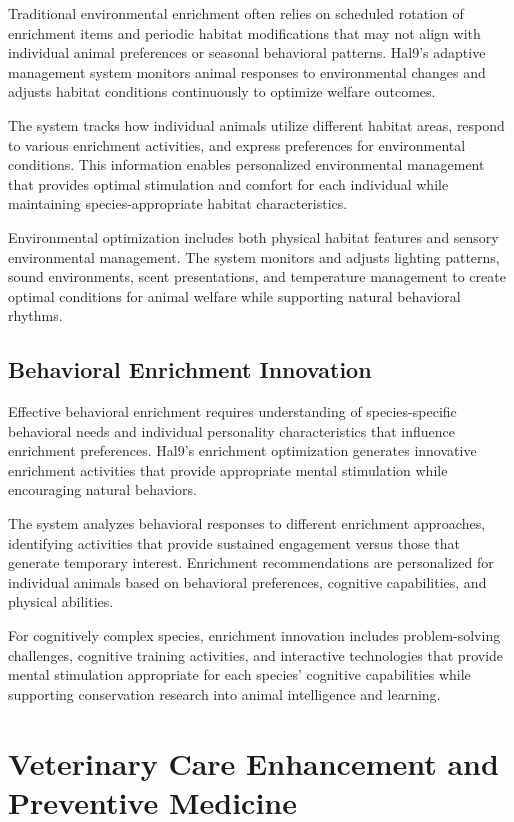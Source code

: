 \documentclass[
  Letterpaper,
]{scrbook}
\begin{document}
Traditional environmental enrichment often relies on scheduled rotation
of enrichment items and periodic habitat modifications that may not
align with individual animal preferences or seasonal behavioral
patterns. Hal9's adaptive management system monitors animal responses to
environmental changes and adjusts habitat conditions continuously to
optimize welfare outcomes.

The system tracks how individual animals utilize different habitat
areas, respond to various enrichment activities, and express preferences
for environmental conditions. This information enables personalized
environmental management that provides optimal stimulation and comfort
for each individual while maintaining species-appropriate habitat
characteristics.

Environmental optimization includes both physical habitat features and
sensory environmental management. The system monitors and adjusts
lighting patterns, sound environments, scent presentations, and
temperature management to create optimal conditions for animal welfare
while supporting natural behavioral rhythms.

\subsection{Behavioral Enrichment
Innovation}\label{behavioral-enrichment-innovation}

Effective behavioral enrichment requires understanding of
species-specific behavioral needs and individual personality
characteristics that influence enrichment preferences. Hal9's enrichment
optimization generates innovative enrichment activities that provide
appropriate mental stimulation while encouraging natural behaviors.

The system analyzes behavioral responses to different enrichment
approaches, identifying activities that provide sustained engagement
versus those that generate temporary interest. Enrichment
recommendations are personalized for individual animals based on
behavioral preferences, cognitive capabilities, and physical abilities.

For cognitively complex species, enrichment innovation includes
problem-solving challenges, cognitive training activities, and
interactive technologies that provide mental stimulation appropriate for
each species' cognitive capabilities while supporting conservation
research into animal intelligence and learning.

\section{Veterinary Care Enhancement and Preventive
Medicine}\label{veterinary-care-enhancement-and-preventive-medicine}
\end{document}
